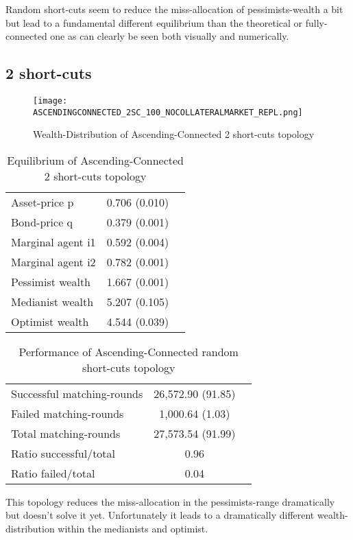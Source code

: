 \documentclass[Bachelorarbeit.tex]{subfiles}
\begin{document}
Random short-cuts seem to reduce the miss-allocation of pessimists-wealth a bit but lead to a fundamental different equilibrium than the theoretical or fully-connected one as can clearly be seen both visually and numerically.

\subsection{2 short-cuts}
\begin{figure}[H]
	\centering
  \texttt{[image: ASCENDINGCONNECTED\_2SC\_100\_NOCOLLATERALMARKET\_REPL.png]}
	\caption{Wealth-Distribution of Ascending-Connected 2 short-cuts topology}
	\label{fig:wealth_ASCENDINGCONNECTED_2SC_100_NOCOLLATERALMARKET_REPL}
\end{figure}

\begin{table}[H]
	\caption{Equilibrium of Ascending-Connected 2 short-cuts topology}
	\centering
	\begin{tabular} { l c r }
		\hline
		Asset-price p & 0.706 (0.010) \\
		Bond-price q & 0.379 (0.001) \\
		Marginal agent i1 & 0.592 (0.004) \\
		Marginal agent i2 & 0.782 (0.001) \\
		\hline
		Pessimist wealth & 1.667 (0.001) \\
		Medianist wealth & 5.207 (0.105) \\
		Optimist wealth & 4.544 (0.039) \\
		\hline
	\end{tabular}
\end{table} 

\begin{table}[H]
	\caption{Performance of Ascending-Connected random short-cuts topology}
	\centering
	\begin{tabular} { l c r }
		\hline
		Successful matching-rounds & 26,572.90 (91.85) \\
		Failed matching-rounds & 1,000.64 (1.03) \\
		Total matching-rounds & 27,573.54 (91.99) \\
		\hline
		Ratio successful/total & 0.96 \\
		Ratio failed/total & 0.04 \\
		\hline
	\end{tabular}
\end{table}

This topology reduces the miss-allocation in the pessimists-range dramatically but doesn't solve it yet. Unfortunately it leads to a dramatically different wealth-distribution within the medianists and optimist.
\end{document}
